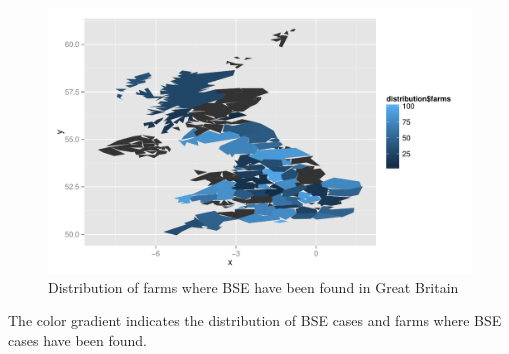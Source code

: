 \documentclass{article}\usepackage[]{graphicx}\usepackage[]{color}
\newenvironment{knitrout}{}{} %
\begin{document}
\begin{knitrout}\footnotesize
{}\color{fgcolor}\begin{figure}[H]

\includegraphics[width=\textwidth]{figure/farm} \caption[Distribution of farms where BSE have been found in Great Britain]{Distribution of farms where BSE have been found in Great Britain\label{fig:farm}}
\end{figure}


\end{knitrout}

The color gradient indicates the distribution of BSE cases and farms where BSE cases have been found.
\end{document}
